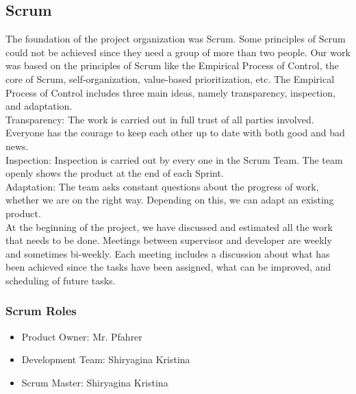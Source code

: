 \documentclass{scrartcl}
\begin{document}
  		
  		
  		
  		
 	    \subsection{Scrum}  	
 	    The foundation of the project organization was Scrum.
 	    Some principles of Scrum could not be achieved since they need a group of more than two people. 
 	    Our work was based on the principles of Scrum like the Empirical Process of Control, the core of Scrum, self-organization, value-based prioritization, etc.
 	    The Empirical Process of Control includes three main ideas, namely transparency, inspection, and adaptation. \\
 	    Transparency: The work is carried out in full trust of all parties involved. Everyone has the courage to keep each other up to date with both good and bad news. \\ 
 	    Inspection: Inspection is carried out by every one in the Scrum Team. The team openly shows the product at the end of each Sprint.			 \\
 	    Adaptation: The team asks constant questions about the progress of work, whether we are on the right way. Depending on this, we can adapt an existing product.		 \\
 	    
 	    At the beginning of the project, we have discussed and estimated all the work that needs to be done. 
 	    Meetings between supervisor and developer are weekly and sometimes bi-weekly.
 	    Each meeting includes a discussion about what has been achieved 
 	    since the tasks have been assigned, what can be improved, and scheduling of future tasks.
 	    
 	    
 	    
 	    
 	    
  		\subsubsection{Scrum Roles}
  		\begin{itemize}
  		\item Product Owner: Mr. Pfahrer
  		\item Development Team: Shiryagina Kristina
  		\item Scrum Master: Shiryagina Kristina
  		
  		\end{itemize}
\end{document}
